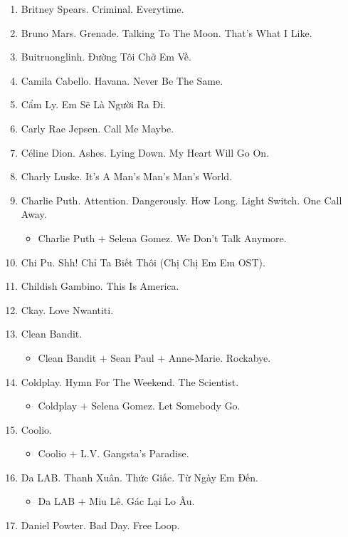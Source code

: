\documentclass{article}
\begin{document}
\begin{enumerate}
	\item {\sc Britney Spears.} Criminal. Everytime.
	\item {\sc Bruno Mars.} Grenade. Talking To The Moon. That's What I Like.
	\item {\sc Buitruonglinh.} Đường Tôi Chở Em Về.
	\item {\sc Camila Cabello.} Havana. Never Be The Same.
	\item {\sc Cẩm Ly.} Em Sẽ Là Người Ra Đi.
	\item {\sc Carly Rae Jepsen.} Call Me Maybe.
	\item {\sc C\'eline Dion.} Ashes. Lying Down. My Heart Will Go On.
	\item {\sc Charly Luske.} It's A Man's Man's Man's World.
	\item {\sc Charlie Puth.} Attention. Dangerously. How Long. Light Switch. One Call Away.
	\begin{itemize}
		\item {\sc Charlie Puth $+$ Selena Gomez.} We Don't Talk Anymore.
	\end{itemize}
	\item {\sc Chi Pu.} Shh! Chỉ Ta Biết Thôi (Chị Chị Em Em OST).
	\item {\sc Childish Gambino.} This Is America.
	\item {\sc Ckay.} Love Nwantiti.
	\item {\sc Clean Bandit.}
	\begin{itemize}
		\item {\sc Clean Bandit $+$ Sean Paul $+$ Anne-Marie.} Rockabye.
	\end{itemize}
	\item {\sc Coldplay.} Hymn For The Weekend. The Scientist.
	\begin{itemize}
		\item {\sc Coldplay $+$ Selena Gomez.} Let Somebody Go.
	\end{itemize}
	\item {\sc Coolio.}
	\begin{itemize}
		\item {\sc Coolio $+$ L.V.} Gangsta's Paradise.
	\end{itemize}
	\item {\sc Da LAB.} Thanh Xuân. Thức Giấc. Từ Ngày Em Đến.
	\begin{itemize}
		\item {\sc Da LAB $+$ Miu Lê.} Gác Lại Lo Âu.
	\end{itemize}
	\item {\sc Daniel Powter.} Bad Day. Free Loop.

\end{enumerate}
\end{document}
